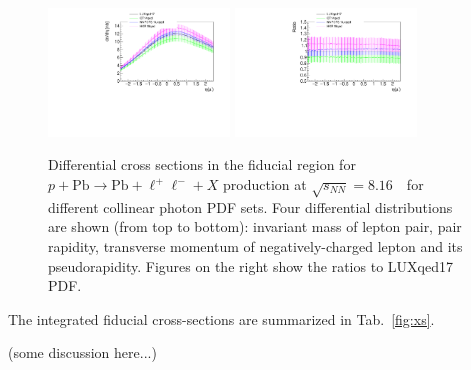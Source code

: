 \begin{figure}[h!]
\includegraphics[width=0.43\textwidth]{figures/etal_inc_cut.pdf}
\includegraphics[width=0.43\textwidth]{figures/Ratioetal_inc_cut.pdf}
\caption{Differential cross sections in the fiducial region for $p+\textrm{Pb}\rightarrow \textrm{Pb} + \ell^+\ell^- + X$ production at $\sqrt{s_{N N}} = 8.16$~\TeV\ for different collinear photon PDF sets.
Four differential distributions are shown (from top to bottom): invariant mass of lepton pair, pair rapidity, transverse momentum of negatively-charged lepton and its pseudorapidity. Figures on the right show the ratios to LUXqed17 PDF.}
\label{fig:inc_cut}
\end{figure}

The integrated fiducial cross-sections are summarized in Tab.~\ref{fig:xs}.

(some discussion here...)


